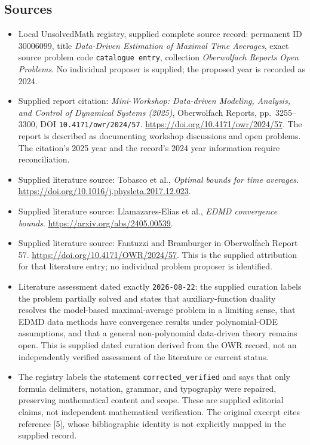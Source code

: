 \documentclass[11pt]{article}
\begin{document}
\subsection{Sources}
\begin{itemize}
\item Local UnsolvedMath registry, supplied complete source record: permanent ID \(30006099\), title \emph{Data-Driven Estimation of Maximal Time Averages}, exact source problem code \texttt{catalogue entry}, collection \emph{Oberwolfach Reports Open Problems}. No individual proposer is supplied; the proposed year is recorded as 2024.
\item Supplied report citation: \emph{Mini-Workshop: Data-driven Modeling, Analysis, and Control of Dynamical Systems (2025)}, Oberwolfach Reports, pp.\ 3255--3300, DOI \texttt{10.4171/owr/2024/57}. \url{https://doi.org/10.4171/owr/2024/57}. The report is described as documenting workshop discussions and open problems. The citation's 2025 year and the record's 2024 year information require reconciliation.
\item Supplied literature source: Tobasco et al., \emph{Optimal bounds for time averages}. \url{https://doi.org/10.1016/j.physleta.2017.12.023}.
\item Supplied literature source: Llamazares-Elias et al., \emph{EDMD convergence bounds}. \url{https://arxiv.org/abs/2405.00539}.
\item Supplied literature source: Fantuzzi and Bramburger in Oberwolfach Report 57. \url{https://doi.org/10.4171/OWR/2024/57}. This is the supplied attribution for that literature entry; no individual problem proposer is identified.
\item Literature assessment dated exactly \texttt{2026-08-22}: the supplied curation labels the problem partially solved and states that auxiliary-function duality resolves the model-based maximal-average problem in a limiting sense, that EDMD data methods have convergence results under polynomial-ODE assumptions, and that a general non-polynomial data-driven theory remains open. This is supplied dated curation derived from the OWR record, not an independently verified assessment of the literature or current status.
\item The registry labels the statement \texttt{corrected\_verified} and says that only formula delimiters, notation, grammar, and typography were repaired, preserving mathematical content and scope. These are supplied editorial claims, not independent mathematical verification. The original excerpt cites reference [5], whose bibliographic identity is not explicitly mapped in the supplied record.
\end{itemize}
\end{document}
